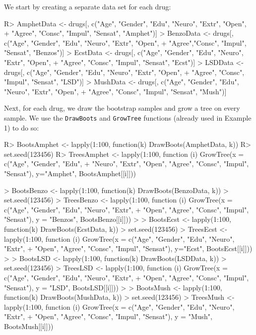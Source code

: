 We start by creating a separate data set for each drug:
\begin{example}
R> AmphetData <- drugs[, c("Age", "Gender", "Edu", "Neuro", "Extr", "Open", 
+    "Agree", "Consc", "Impul", "Sensat", "Amphet")]
> BenzoData <- drugs[, c("Age", "Gender", "Edu", "Neuro", "Extr", "Open", 
+    "Agree","Consc", "Impul", "Sensat", "Benzos")]
> EcstData <- drugs[, c("Age", "Gender", "Edu", "Neuro", "Extr", "Open", 
+    "Agree", "Consc", "Impul", "Sensat", "Ecst")]
> LSDData <- drugs[, c("Age", "Gender", "Edu", "Neuro", "Extr", "Open", 
+    "Agree", "Consc", "Impul", "Sensat", "LSD")]
> MushData <- drugs[, c("Age", "Gender", "Edu", "Neuro", "Extr", "Open", 
+    "Agree", "Consc", "Impul", "Sensat", "Mush")]
\end{example}

Next, for each drug, we draw the bootstrap samples and grow a tree on every sample. We use the \texttt{DrawBoots} and \texttt{GrowTree} functions (already used in Example 1) to do so:
\begin{example}

R> BootsAmphet <- lapply(1:100, function(k) DrawBoots(AmphetData, k))
R> set.seed(123456)
R> TreesAmphet <- lapply(1:100, function (i) GrowTree(x = c("Age", "Gender", "Edu",   
+    "Neuro", "Extr", "Open", "Agree", "Consc", "Impul", "Sensat"), y="Amphet", BootsAmphet[[i]]))

> BootsBenzo <- lapply(1:100, function(k) DrawBoots(BenzoData, k))
> set.seed(123456)
> TreesBenzo <- lapply(1:100, function (i) GrowTree(x = c("Age", "Gender", "Edu", "Neuro", "Extr",
+    "Open", "Agree", "Consc", "Impul", "Sensat"), y = "Benzos", BootsBenzo[[i]]))
> 
> BootsEcst <- lapply(1:100, function(k) DrawBoots(EcstData, k))
> set.seed(123456)
> TreesEcst <- lapply(1:100, function (i) GrowTree(x = c("Age", "Gender", "Edu", "Neuro", "Extr",  
+    "Open", "Agree", "Consc", "Impul", "Sensat"), y="Ecst",  BootsEcst[[i]]))
> 
> BootsLSD <- lapply(1:100, function(k) DrawBoots(LSDData, k))
> set.seed(123456)
> TreesLSD <- lapply(1:100, function (i) GrowTree(x = c("Age", "Gender", "Edu", "Neuro", "Extr", 
+    "Open", "Agree", "Consc", "Impul", "Sensat"), y = "LSD", BootsLSD[[i]]))
> 
> BootsMush <- lapply(1:100, function(k) DrawBoots(MushData, k))
> set.seed(123456)
> TreesMush <- lapply(1:100, function (i) GrowTree(x = c("Age", "Gender", "Edu",  "Neuro", "Extr", 
+    "Open", "Agree", "Consc", "Impul", "Sensat"), y = "Mush",  BootsMush[[i]]))

\end{example}


